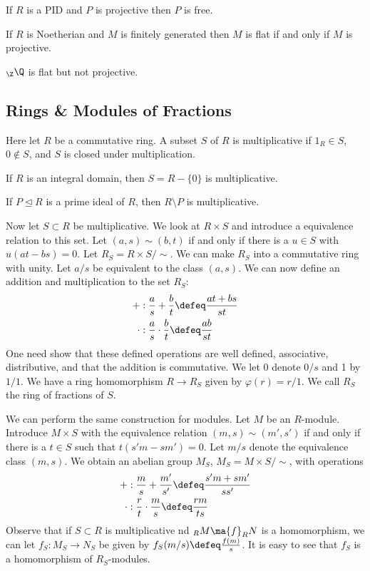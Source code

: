 \begin{thm}
If $R$ is a PID and $P$ is projective then $P$ is free. 
\end{thm}

\begin{thm}
If $R$ is Noetherian and $M$ is finitely generated then $M$ is flat if and only if $M$ is projective. 
\end{thm}

\begin{ex}
$_\Z \Q$ is flat but not projective. 
\end{ex}

\subsection{Rings \& Modules of Fractions}

Here let $R$ be a commutative ring. A subset $S$ of $R$ is multiplicative if $1_R \in S$, $0 \notin S$, and $S$ is closed under multiplication. 

\begin{ex}
If $R$ is an integral domain, then $S=R-\{0\}$ is multiplicative. 
\end{ex}

\begin{ex}
If $P \unlhd R$ is a prime ideal of $R$, then $R\setminus P$ is multiplicative. 
\end{ex}

Now let $S \subset R$ be multiplicative. We look at $R \times S$ and introduce a equivalence relation to this set. Let $(a,s) \sim (b,t)$ if and only if there is a $u \in S$ with $u(at-bs)=0$. Let $R_S=R \times S /\sim$. We can make $R_S$ into a commutative ring with unity. Let $a/s$ be equivalent to the class $(a,s)$. We can now define an addition and multiplication to the set $R_S$:
\[
\begin{split}
+&: \frac{a}{s}+\frac{b}{t} \defeq \frac{at+bs}{st} \\
\cdot &: \frac{a}{s}\cdot \frac{b}{t} \defeq \frac{ab}{st} 
\end{split}
\]
One need show that these defined operations are well defined, associative, distributive, and that the addition is commutative. We let 0 denote $0/s$ and 1 by $1/1$. We have a ring homomorphism $R \rightarrow R_S$ given by $\varphi(r)=r/1$. We call $R_S$ the ring of fractions of $S$. 

We can perform the same construction for modules. Let $M$ be an $R$-module. Introduce $M \times S$ with the equivalence relation $(m,s) \sim (m',s')$ if and only if there is a $t \in S$ such that $t(s'm-sm')=0$. Let $m/s$ denote the equivalence class $(m,s)$. We obtain an abelian group $M_S$, $M_S=M \times S/\sim$, with operations
\[
\begin{split}
+&: \frac{m}{s}+\frac{m'}{s'} \defeq \frac{s'm+sm'}{ss'} \\
\cdot &: \frac{r}{t} \cdot \frac{m}{s} \defeq \frac{rm}{ts} 
\end{split}
\]
Observe that if $S \subset R$ is multiplicative nd $_R M \ma{f} _R N$ is a homomorphism, we can let $f_S: M _S \rightarrow N_S$ be given by $f_S(m/s) \defeq \frac{f(m)}{s}$. It is easy to see that $f_S$ is a homomorphism of $R_S$-modules. 

